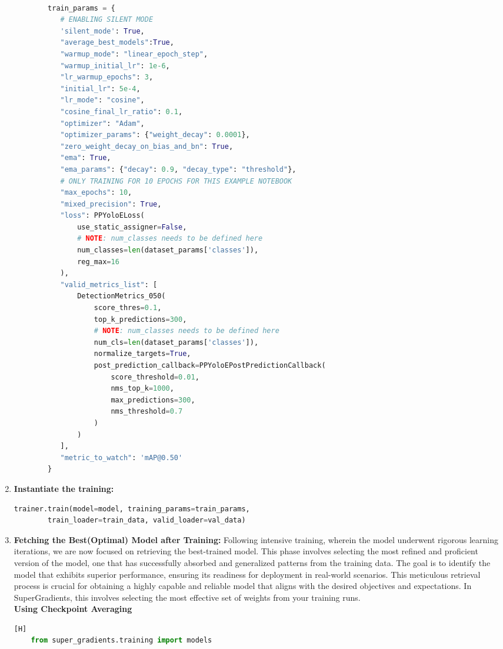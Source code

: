 \begin{enumerate}
\begin{lstlisting}[language=Python]
        
        train_params = {
           # ENABLING SILENT MODE
           'silent_mode': True,
           "average_best_models":True,
           "warmup_mode": "linear_epoch_step",
           "warmup_initial_lr": 1e-6,
           "lr_warmup_epochs": 3,
           "initial_lr": 5e-4,
           "lr_mode": "cosine",
           "cosine_final_lr_ratio": 0.1,
           "optimizer": "Adam",
           "optimizer_params": {"weight_decay": 0.0001},
           "zero_weight_decay_on_bias_and_bn": True,
           "ema": True,
           "ema_params": {"decay": 0.9, "decay_type": "threshold"},
           # ONLY TRAINING FOR 10 EPOCHS FOR THIS EXAMPLE NOTEBOOK
           "max_epochs": 10,
           "mixed_precision": True,
           "loss": PPYoloELoss(
               use_static_assigner=False,
               # NOTE: num_classes needs to be defined here
               num_classes=len(dataset_params['classes']),
               reg_max=16
           ),
           "valid_metrics_list": [
               DetectionMetrics_050(
                   score_thres=0.1,
                   top_k_predictions=300,
                   # NOTE: num_classes needs to be defined here
                   num_cls=len(dataset_params['classes']),
                   normalize_targets=True,
                   post_prediction_callback=PPYoloEPostPredictionCallback(
                       score_threshold=0.01,
                       nms_top_k=1000,
                       max_predictions=300,
                       nms_threshold=0.7
                   )
               )
           ],
           "metric_to_watch": 'mAP@0.50'
        }
    \end{lstlisting}
    \item \textbf{Instantiate the training: }
    \begin{lstlisting}[language=Python, caption=Commencing the Training, escapeinside=``]
        trainer.train(model=model, training_params=train_params,
        train_loader=train_data, valid_loader=val_data)
    \end{lstlisting}
    \item \textbf{ Fetching the Best(Optimal) Model after Training: } Following intensive training, wherein the model underwent rigorous learning iterations, we are now focused on retrieving the best-trained model. This phase involves selecting the most refined and proficient version of the model, one that has successfully absorbed and generalized patterns from the training data. The goal is to identify the model that exhibits superior performance, ensuring its readiness for deployment in real-world scenarios. This meticulous retrieval process is crucial for obtaining a highly capable and reliable model that aligns with the desired objectives and expectations. In SuperGradients, this involves selecting the most effective set of weights from your training runs.\\
    \textbf{Using Checkpoint Averaging}
    \begin{addmargin}[8mm]{0mm}
    \begin{lstlisting}[language=Python, caption=Load trained model][H]
    from super_gradients.training import models


\end{lstlisting}
\end{addmargin}
\end{enumerate}
